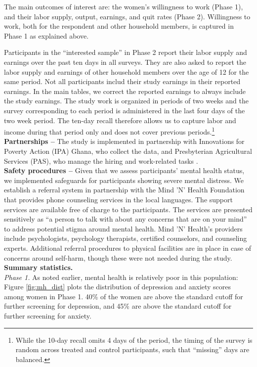 \documentclass[12pt, a4paper, american]{article}
\begin{document}
The main outcomes of interest are: the women's willingness to work (Phase 1), and their labor supply, output, earnings, and quit rates (Phase 2). Willingness to work, both for the respondent and other household members, is captured in Phase 1 as explained above. 

Participants in the ``interested sample'' in Phase 2 report their labor supply and earnings over the past ten days in all surveys. They are also asked to report the labor supply and earnings of other  household members over the age of 12 for the same period. Not all participants includ their study earnings in their reported earnings. In the main tables, we correct the reported earnings to always include the study earnings. The study work is organized in periods of two weeks and the survey corresponding to each period is administered in the last four days of the two week period. The ten-day recall therefore allows us to capture labor and income during that period only and does not cover previous periods.\footnote{While the 10-day recall omits 4 days of the period, the timing of the survey is random across treated and control participants, such that ``missing'' days are balanced.}  \\


\textbf{Partnerships --} The study is implemented in partnership with Innovations for Poverty Action (IPA) Ghana, who collect the data, and Presbyterian Agricultural Services (PAS), who manage the hiring and work-related tasks \citep[in a fashion similar to][]{banerjee_does_2020}. \\


\textbf{Safety procedures --} Given that we assess participants' mental health status, we implemented safeguards for participants showing severe mental distress. We establish a referral system in partnership with the  Mind 'N' Health Foundation that provides phone counseling services in the local languages. The support services are available free of charge to the participants. The services are presented sensitively as ``a person to talk with about any concerns that are on your mind'' to address potential stigma around mental health. Mind 'N' Health's providers include psychologists, psychology therapists, certified counselors, and counseling experts. Additional referral procedures to physical facilities are in place in case of concerns around self-harm, though these were not needed during the study. \\


\textbf{Summary statistics.} \\
\textit{Phase 1.} As noted earlier, mental health is relatively poor in this population: Figure \ref{fig:mh_dist} plots the distribution of depression and anxiety scores among women in Phase 1. 40\% of the women are above the standard cutoff for further screening for depression, and 45\% are above the standard cutoff for further screening for anxiety. 
\end{document}
